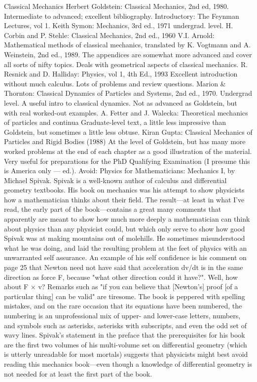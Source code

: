 \documentclass[10pt,a4paper]{book}
\theoremstyle{definition}
\begin{document}
Classical Mechanics
Herbert Goldstein: Classical Mechanics, 2nd ed, 1980.
Intermediate to advanced; excellent bibliography.
Introductory: The Feynman Lectures, vol 1.
Keith Symon: Mechanics, 3rd ed., 1971 undergrad. level.
H. Corbin and P. Stehle: Classical Mechanics, 2nd ed., 1960
V.I. Arnold: Mathematical methods of classical mechanics, translated by K. Vogtmann and A. Weinstein, 2nd ed., 1989.
The appendices are somewhat more advanced and cover all sorts of nifty topics.  Deals with geometrical aspects of classical mechanics.
R. Resnick and D. Halliday: Physics, vol 1, 4th Ed., 1993
Excellent introduction without much calculus.  Lots of problems and review questions.
Marion \& Thornton: Classical Dynamics of Particles and Systems, 2nd ed., 1970.
Undergrad level.  A useful intro to classical dynamics.  Not as advanced as Goldstein, but with real worked-out examples.
A. Fetter and J. Walecka: Theoretical mechanics of particles and continua
Graduate-level text, a little less impressive than Goldstein, but sometimes a little less obtuse.
Kiran Gupta: Classical Mechanics of Particles and Rigid Bodies (1988)
At the level of Goldstein, but has many more worked problems at the end of each chapter as a good illustration of the material.  Very useful for preparations for the PhD Qualifying Examination (I presume this is America only — ed.).
Avoid: Physics for Mathematicians: Mechanics I, by Michael Spivak.
Spivak is a well-known author of calculus and differential geometry textbooks.  His book on mechanics was his attempt to show physicists how a mathematician thinks about their field.  The result—at least in what I've read, the early part of the book—contains a great many comments that apparently are meant to show how much more deeply a mathematician can think about physics than any physicist could, but which only serve to show how good Spivak was at making mountains out of molehills.  He sometimes misunderstood what he was doing, and laid the resulting problem at the feet of physics with an unwarranted self assurance.  An example of his self confidence is his comment on page 25 that Newton need not have said that acceleration dv/dt is in the same direction as force F, because "what other direction could it have?".  Well, how about F × v?  Remarks such as "if you can believe that [Newton's] proof [of a particular thing] can be valid" are tiresome.  The book is peppered with spelling mistakes, and on the rare occasion that its equations have been numbered, the numbering is an unprofessional mix of upper- and lower-case letters, numbers, and symbols such as asterisks, asterisks with subscripts, and even the odd set of wavy lines.  Spivak's statement in the preface that the prerequisites for his book are the first two volumes of his multi-volume set on differential geometry (which is utterly unreadable for most mortals) suggests that physicists might best avoid reading this mechanics book—even though a knowledge of differential geometry is not needed for at least the first part of the book.
\end{document}
